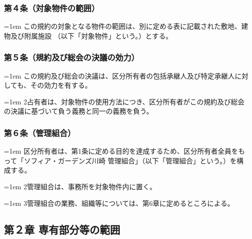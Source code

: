 \documentclass[
  luatex,
  paper=a4paper,
  fontsize=11pt,
  jafontsize=11pt,
  jlreq_notes,
]{jlreq}
\newcommand{\joumain}[1]{%
  \noindent\hangindent=1em\hangafter=1
  \hspace{1em}#1%
}
\newcommand{\kou}[2]{%
  \par\noindent\hangindent=1em\hangafter=1
  #1\hspace{1em}#2%
}
\begin{document}
  \subsubsection*{第４条（対象物件の範囲）}
  \joumain{この規約の対象となる物件の範囲は、別に定める表に記載された敷地、建物及び附属施設
  （以下「対象物件」という。）とする。}

  \subsubsection*{第５条（規約及び総会の決議の効力）}
  \joumain{この規約及び総会の決議は、区分所有者の包括承継人及び特定承継人に対しても、その効力を有する。}
  \kou{2}{占有者は、対象物件の使用方法につき、区分所有者がこの規約及び総会の決議に基づいて負う義務と同一の義務を負う。}

  \subsubsection*{第６条（管理組合）}
  \joumain{区分所有者は、第1条に定める目的を達成するため、区分所有者全員をもって「ソフィア・ガーデンズ川崎
  管理組合」（以下「管理組合」という。）を構成する。}
  \kou{2}{管理組合は、事務所を対象物件内に置く。}
  \kou{3}{管理組合の業務、組織等については、第6章に定めるところによる。}

  \begin{center}
    \subsection*{第２章 専有部分等の範囲}
  \end{center}
\end{document}
